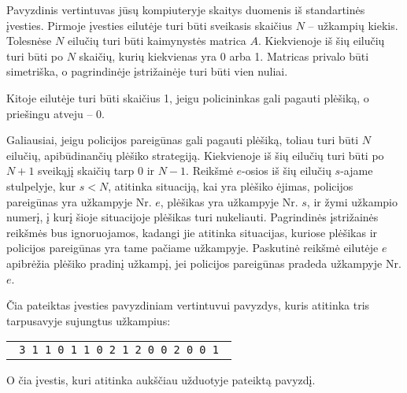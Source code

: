 \documentclass{boi2014-lt}
\begin{document}
    \Experimentation
	Pavyzdinis vertintuvas jūsų kompiuteryje skaitys duomenis iš standartinės
	įvesties. Pirmoje įvesties eilutėje turi būti sveikasis skaičius $N$ --
	užkampių kiekis. Tolesnėse $N$ eilučių turi būti kaimynystės matrica $A$.
	Kiekvienoje iš šių eilučių turi būti po $N$ skaičių, kurių kiekvienas yra
	0 arba 1. Matricas privalo būti simetriška, o pagrindinėje įstrižainėje
	turi būti vien nuliai.

	Kitoje eilutėje turi būti skaičius 1, jeigu policininkas gali pagauti
	plėšiką, o priešingu atveju -- 0.

	Galiausiai, jeigu policijos pareigūnas gali pagauti plėšiką, toliau turi
	būti $N$ eilučių, apibūdinančių plėšiko strategiją. Kiekvienoje iš šių
	eilučių turi būti po $N + 1$ sveikąjį skaičių tarp 0 ir $N - 1$. Reikšmė
	$e$-osios iš šių eilučių $s$-ajame stulpelyje, kur $s < N$, atitinka
	situaciją, kai yra plėšiko ėjimas, policijos pareigūnas yra užkampyje
	Nr. $e$, plėšikas yra užkampyje Nr. $s$, ir žymi užkampio numerį, į kurį
	šioje situacijoje plėšikas turi nukeliauti. Pagrindinės įstrižainės
	reikšmės bus ignoruojamos, kadangi jie atitinka situacijas, kuriose
	plėšikas ir policijos pareigūnas yra tame pačiame užkampyje. Paskutinė
	reikšmė eilutėje $e$ apibrėžia plėšiko pradinį užkampį, jei policijos
	pareigūnas pradeda užkampyje Nr. $e$.

	Čia pateiktas įvesties pavyzdiniam vertintuvui pavyzdys, kuris atitinka
	tris tarpusavyje sujungtus užkampius:

    \begin{center}
        \begin{tabular}{p{4cm}}
            {\tt
                3 \newline
                0 1 1 \newline
                1 0 1 \newline
                1 1 0 \newline
                1 \newline
                0 2 1 2 \newline
                2 0 0 2 \newline
                1 0 0 1 \newline
            }
        \end{tabular}
    \end{center}

	O čia įvestis, kuri atitinka aukščiau užduotyje pateiktą pavyzdį.
\end{document}
